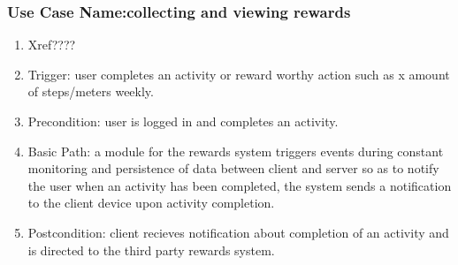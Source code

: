 \documentclass[11pt,a4paper]{article}
\begin{document}
			\subsubsection{Use Case Name:collecting and viewing rewards}
				\begin{enumerate}
				\renewcommand{\labelenumi}{{\textbf{\arabic{enumi}.}}}
				\item Xref????  %
				\item Trigger: user completes an activity or reward worthy action such as x amount of steps/meters weekly.
				\item Precondition: user is logged in and completes an activity.
				\item Basic Path: a module for the rewards system triggers events during constant monitoring and persistence of data between client and server so as to notify the user when an activity has been completed, the system sends a notification to the client device upon activity completion.
				\item Postcondition: client recieves notification about completion of an activity and is directed to the third party rewards system.
				\end{enumerate}
\end{document}
